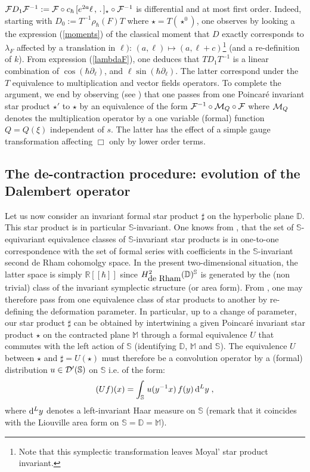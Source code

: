 \documentclass{article}
\newcommand{\DD}{\mathbb D}
\renewcommand{\SS}{\mathbb S}
\newcommand{\R}{\mathbb R}
\newcommand{\MM}{\mathbb M}
\def\cd{{\cal D}}
\def\cf{{\cal F}}
\def\cm{{\cal M}}
\def \R{{\mathbb R}}
\def\cd{{\cal D}}
\begin{document}
$\cf D_1\cf^{-1}:=\cf \circ c_\hbar\,[e^{2a}\ell\,,\,.\,]_\star\circ\cf^{-1}$ is differential and at most first order.
Indeed, starting with $D_0:=T^{-1}\rho_\hbar(F)T$ where $\star=T(\star^0)$, one observes by looking a the expression (\ref{moments}) of the classical moment that $D$ exactly corresponds to $\lambda_F$ affected by a 
translation in $\ell)$: $(a,\ell)\mapsto(a,\ell +c)$\footnote{Note that this symplectic transformation leaves Moyal' star product invariant.} (and a re-definition of $k$). From expression (\ref{lambdaF}), one 
deduces that $TD_1T^{-1}$ is a linear combination of $\cos(\hbar\partial_\ell)$,  
and $\ell\sin(\hbar\partial_\ell)$. The latter correspond under the $T$ equivalence to multiplication and 
vector fields operators. To complete the argument, we end by observing (see \cite{Bi07}) that one passes from one 
Poincar\'e invariant star product $\star'$ to $\star$ by an equivalence of the form $\cf^{-1}\circ\cm_{Q}\circ\cf$ where 
$\cm_Q$ denotes the multiplication operator by a one variable (formal) function $Q=Q(\xi)$ independent of $s$.
The latter has the effect of a simple gauge transformation affecting $\Box$ only by lower order terms.

\subsection{The de-contraction procedure: evolution of the Dalembert operator}
Let us now consider an invariant formal star product $\sharp$ on the hyperbolic plane $\DD$.
This star product is in particular $\SS$-invariant. One knows from \cite{BBG}, that the set 
of $\SS$-equivariant equivalence classes of $\SS$-invariant star products is in one-to-one correspondence with the set of  formal series with coefficients in the $\SS$-invariant second de Rham cohomolgy space. In the present two-dimensional situation, the latter space is simply
$\R[[\hbar]]$ since $H^2_{\mbox{\rm de Rham}}(\DD)^\SS$ is generated by the (non trivial) class
of the invariant symplectic structure (or area form). From \cite{BB}, one may therefore pass from one equivalence class of star products to another by re-defining the deformation parameter. In particular, up to a 
change of parameter, our star product $\sharp$ can be obtained by intertwining a given Poincar\'e
invariant star product $\star$ on the contracted plane $\MM$ through a formal equivalence $U$
that commutes with the left action of $\SS$ (identifying  $\DD$, $\MM$ and $\SS$). The equivalence $U$ between $\star$ and $\sharp=U(\star)$ must therefore be
a convolution operator by a (formal) distribution $u\in\cd'(\SS)$ on $\SS$ i.e. of the form:
\begin{equation}\label{conv}
(U f)(x) =  \int_{\SS\,}
u(y^{-1}x)\,f(y) \,{\rm d}^Ly\;,
\end{equation}
where ${\rm d}^Ly$ denotes a left-invariant Haar measure on $\SS$ (remark that it coincides with the
Liouville area form on $\SS=\DD=\MM$).
\end{document}
